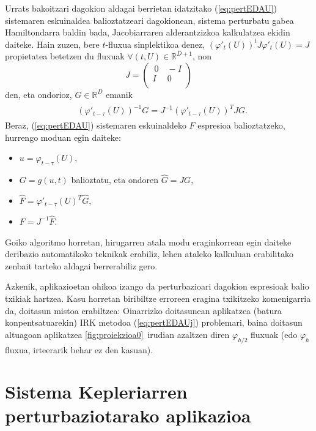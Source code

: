 Urrats bakoitzari dagokion aldagai berrietan idatzitako (\ref{eq:pertEDAU}) sistemaren eskuinaldea balioztatzeari dagokionean, sistema perturbatu gabea Hamiltondarra baldin bada, Jacobiarraren alderantzizkoa kalkulatzea ekidin daiteke.  Hain zuzen, bere $t$-fluxua sinplektikoa denez,  $(\varphi'_{t}(U))^tJ\varphi'_{t}(U)= J$ propietatea betetzen du fluxuak $\forall(t,U) \in \mathbb{R}^{D+1}$, non
\begin{equation*}
 J=\left(\begin{array}{cc}
   \ 0 & \ -I \\
     I & \ 0  \\
\end{array}\right)
\end{equation*}
den, eta  ondorioz, $G \in \mathbb{R}^D$ emanik
%
\begin{align}
\begin{split}
\label{eq:hamEDAU2}
& (\varphi'_{t-\tau}(U) )^{-1} G = J^{-1}(\varphi'_{t-\tau}(U))^{T} J G.
\end{split}
\end{align}
%
Beraz,  (\ref{eq:pertEDAU})  sistemaren eskuinaldeko $F$ espresioa balioztatzeko, hurrengo moduan egin daiteke:
\begin{itemize}
\item $u=\varphi_{t-\tau}(U)$,
\item $G=g(u,t)$ balioztatu, eta ondoren $\widehat G=J G$,
\item $\widehat F = \varphi'_{t-\tau}(U)^{T} \widehat G$,
\item $F = J^{-1} \widehat F$.
\end{itemize}
%
Goiko algoritmo horretan, hirugarren atala modu eraginkorrean egin daiteke deribazio automatikoko teknikak erabiliz, lehen ataleko kalkuluan erabilitako zenbait tarteko aldagai berrerabiliz gero.


Azkenik, aplikazioetan ohikoa izango da perturbazioari dagokion espresioak balio txikiak hartzea. Kasu horretan biribiltze erroreen eragina txikitzeko komenigarria da, doitasun mistoa erabiltzea: Oinarrizko doitasunean aplikatzea (batura konpentsatuarekin) IRK metodoa (\ref{eq:pertEDAUj}) problemari, baina doitasun altuagoan aplikatzea  \ref{fig:proiekzioa0}~irudian azaltzen diren $\varphi_{h/2}$ fluxuak (edo $\varphi_{h}$ fluxua, irteerarik behar ez den kasuan).




\section{Sistema Kepleriarren perturbaziotarako aplikazioa}
\label{s:Keplerrak}

